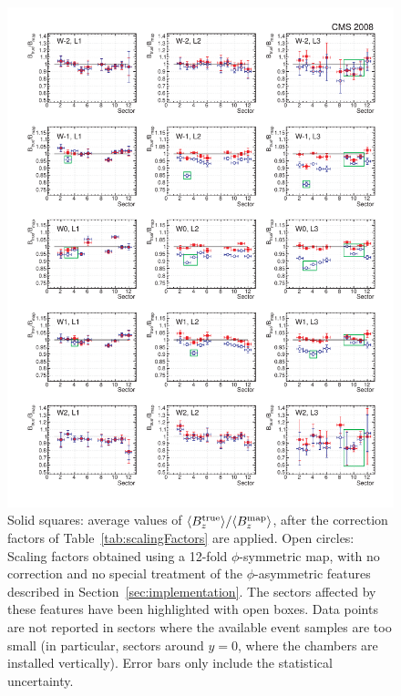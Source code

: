 \begin{figure}
  \begin{center}
    \includegraphics[width=\textwidth]{fig/2piRescaled_looseCuts}
    \caption{Solid squares: average values of
      $\langle{B_z^{\rm true}}\rangle/\langle{B_z^{\rm map}}\rangle$, after
      the correction factors of Table~\ref{tab:scalingFactors} are applied.
      Open circles: Scaling factors obtained using a
      12-fold $\phi$-symmetric map, with no correction and no special
      treatment of the $\phi$-asymmetric features described in
      Section~\ref{sec:implementation}. The sectors affected by these
      features have been highlighted with open boxes.
      Data points are not reported in sectors where the available
      event samples are too small
      (in particular, sectors around $y=0$, where the
      chambers are installed vertically). Error bars only include the
statistical uncertainty.
    \label{fig:scalingFactors}}
  \end{center}
\end{figure}
